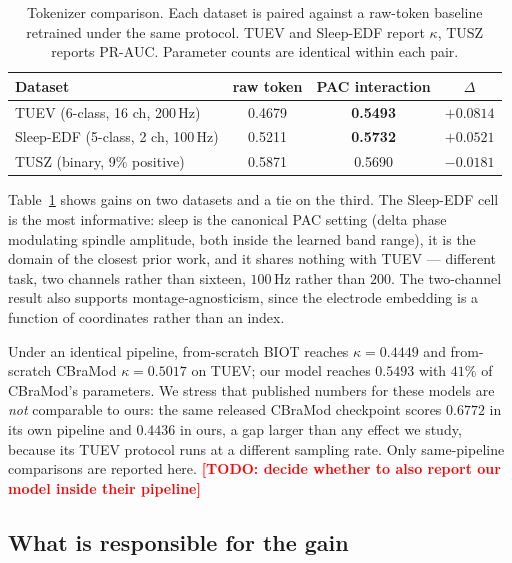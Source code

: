 \documentclass{article}
\newcommand{\todo}[1]{\textcolor{red}{\textbf{[TODO: #1]}}}
\begin{document}
\begin{table}[t]
\caption{Tokenizer comparison. Each dataset is paired against a raw-token
baseline retrained under the same protocol. TUEV and Sleep-EDF report $\kappa$,
TUSZ reports PR-AUC. Parameter counts are identical within each pair.}
\label{tab:main}
\begin{center}
\begin{tabular}{lccc}
\toprule
Dataset & raw token & PAC interaction & $\Delta$ \\
\midrule
TUEV \small(6-class, 16 ch, 200\,Hz) & 0.4679 & \textbf{0.5493} & $+0.0814$ \\
Sleep-EDF \small(5-class, 2 ch, 100\,Hz) & 0.5211 & \textbf{0.5732} & $+0.0521$ \\
TUSZ \small(binary, 9\% positive) & 0.5871 & 0.5690 & $-0.0181$ \\
\bottomrule
\end{tabular}
\end{center}
\end{table}

Table~\ref{tab:main} shows gains on two datasets and a tie on the third. The
Sleep-EDF cell is the most informative: sleep is the canonical PAC setting
(delta phase modulating spindle amplitude, both inside the learned band range),
it is the domain of the closest prior work, and it shares nothing with TUEV ---
different task, two channels rather than sixteen, $100$\,Hz rather than $200$.
The two-channel result also supports montage-agnosticism, since the electrode
embedding is a function of coordinates rather than an index.

Under an identical pipeline, from-scratch BIOT reaches $\kappa=0.4449$ and
from-scratch CBraMod $\kappa=0.5017$ on TUEV; our model reaches $0.5493$ with
$41\%$ of CBraMod's parameters. We stress that published numbers for these
models are \emph{not} comparable to ours: the same released CBraMod checkpoint
scores $0.6772$ in its own pipeline and $0.4436$ in ours, a gap larger than any
effect we study, because its TUEV protocol runs at a different sampling rate.
Only same-pipeline comparisons are reported here.
\todo{decide whether to also report our model inside their pipeline}

\subsection{What is responsible for the gain}
\label{sec:controls}
\end{document}
